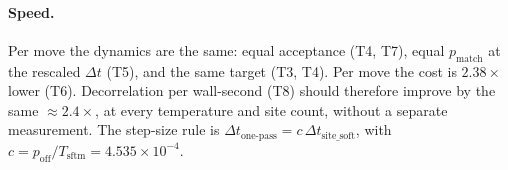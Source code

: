\documentclass[11pt,a4paper]{article}
\newcommand{\dt}{\Delta t}
\begin{document}
\paragraph{Speed.} Per move the dynamics are the same: equal acceptance
(T4, T7), equal $p_{\mathrm{match}}$ at the rescaled $\dt$ (T5), and the same
target (T3, T4). Per move the cost is $2.38\times$ lower (T6). Decorrelation per
wall-second (T8) should therefore improve by the same $\approx2.4\times$, at every
temperature and site count, without a separate measurement. The step-size rule
is $\dt_{\text{one-pass}}=c\,\dt_{\text{site\_soft}}$, with
$c=p_{\mathrm{off}}/T_{\text{sftm}}=4.535\times10^{-4}$.
\end{document}
